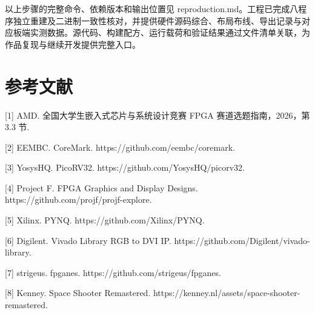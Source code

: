 \documentclass[UTF8,a4paper,12pt]{ctexart}
\begin{document}
以上步骤的完整命令、依赖版本和输出位置见 reproduction.md。工程已完成八程序独立重建及二进制一致性核对，并提供硬件源码综合、布局布线、导出记录与对应板端实测数据。源代码、构建配方、运行载荷和验证结果通过文件清单关联，为作品复现与继续开发提供完整入口。\par

\clearpage\section{参考文献}

[1] AMD. 全国大学生嵌入式芯片与系统设计竞赛 FPGA 赛道选题指南，2026，第 3.3 节.\par

[2] EEMBC. CoreMark. https://github.com/eembc/coremark.\par

[3] YosysHQ. PicoRV32. https://github.com/YosysHQ/picorv32.\par

[4] Project F. FPGA Graphics and Display Designs. https://github.com/projf/projf-explore.\par

[5] Xilinx. PYNQ. https://github.com/Xilinx/PYNQ.\par

[6] Digilent. Vivado Library RGB to DVI IP. https://github.com/Digilent/vivado-library.\par

[7] strigeus. fpganes. https://github.com/strigeus/fpganes.\par

[8] Kenney. Space Shooter Remastered. https://kenney.nl/assets/space-shooter-remastered.\par
\end{document}
